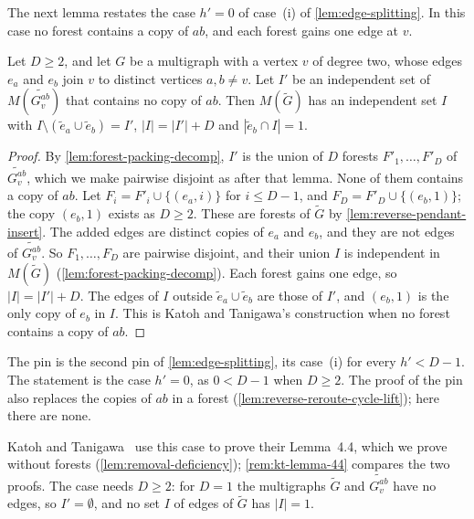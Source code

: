 The next lemma restates the case $h' = 0$ of case~(i) of
\cref{lem:edge-splitting}. In this case no forest contains a copy of
$ab$, and each forest gains one edge at $v$.

\begin{lemma}
  \label{lem:forest-surgery-unsplit}
  \leanok
  Let $D \ge 2$, and let $G$ be a multigraph with a vertex $v$ of degree
  two, whose edges $e_a$ and $e_b$ join $v$ to distinct vertices
  $a, b \neq v$. Let $I'$ be an independent set of
  $M(\widetilde{G_v^{ab}})$ that contains no copy of $ab$. Then
  $M(\tilde G)$ has an independent set $I$ with
  $I \setminus (\tilde e_a \cup \tilde e_b) = I'$, $|I| = |I'| + D$ and
  $|\tilde e_b \cap I| = 1$.
\end{lemma}
\begin{proof}
  \leanok
  By \cref{lem:forest-packing-decomp}, $I'$ is the union of $D$ forests
  $F'_1, \dots, F'_D$ of $\widetilde{G_v^{ab}}$, which we make pairwise
  disjoint as after that lemma. None of them contains a copy of $ab$.
  Let $F_i = F'_i \cup \{(e_a, i)\}$ for
  $i \le D - 1$, and $F_D = F'_D \cup \{(e_b, 1)\}$; the copy $(e_b, 1)$
  exists as $D \ge 2$. These are forests of $\tilde G$ by
  \cref{lem:reverse-pendant-insert}. The added edges are distinct copies
  of $e_a$ and $e_b$, and they are not edges of $\widetilde{G_v^{ab}}$.
  So $F_1, \dots, F_D$ are pairwise disjoint, and their union $I$ is
  independent in $M(\tilde G)$ (\cref{lem:forest-packing-decomp}). Each
  forest gains one edge, so $|I| = |I'| + D$. The edges of $I$ outside
  $\tilde e_a \cup \tilde e_b$ are those of $I'$, and $(e_b, 1)$ is the
  only copy of $e_b$ in $I$. This is Katoh and Tanigawa's construction
  when no forest contains a copy of $ab$.
\end{proof}
\begin{fmlnote}
  The pin is the second pin of \cref{lem:edge-splitting}, its case~(i)
  for every $h' < D - 1$. The statement is the case $h' = 0$, as
  $0 < D - 1$ when $D \ge 2$. The proof of the pin also replaces the
  copies of $ab$ in a forest (\cref{lem:reverse-reroute-cycle-lift}); here
  there are none.
\end{fmlnote}

Katoh and Tanigawa~\cite[p.~662]{katohTanigawa2011} use this case to
prove their Lemma~4.4, which we prove without forests
(\cref{lem:removal-deficiency}); \cref{rem:kt-lemma-44} compares the two
proofs. The case needs $D \ge 2$: for $D = 1$ the multigraphs $\tilde G$
and $\widetilde{G_v^{ab}}$ have no edges, so $I' = \emptyset$, and no set
$I$ of edges of $\tilde G$ has $|I| = 1$.

